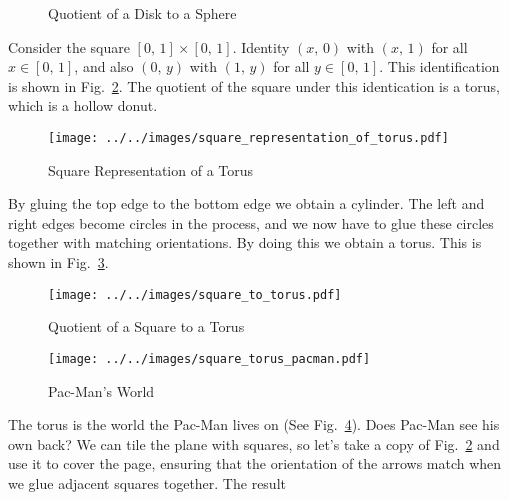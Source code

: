 \documentclass{article}
\theoremstyle{plain}
\theoremstyle{normal}
\begin{document}
        \begin{figure}
            \centering
            \caption{Quotient of a Disk to a Sphere}
            \label{fig:quotient_disk_to_sphere}
        \end{figure}
        Consider the square $[0,\,1]\times[0,\,1]$. Identity
        $(x,\,0)$ with $(x,\,1)$ for all $x\in[0,\,1]$, and also
        $(0,\,y)$ with $(1,\,y)$ for all $y\in[0,\,1]$. This identification
        is shown in Fig.~\ref{fig:square_representation_of_torus}. The quotient
        of the square under this identication is a torus, which is a hollow
        donut.
        \begin{figure}
            \centering
            \texttt{[image: ../../images/square\_representation\_of\_torus.pdf]}
            \caption{Square Representation of a Torus}
            \label{fig:square_representation_of_torus}
        \end{figure}
        \par\hfill\par
        By gluing the top edge to the bottom edge we obtain a cylinder. The
        left and right edges become circles in the process, and we now have to
        glue these circles together with matching orientations. By doing this
        we obtain a torus. This is shown in
        Fig.~\ref{fig:square_to_torus}.
        \begin{figure}
            \centering
            \texttt{[image: ../../images/square\_to\_torus.pdf]}
            \caption{Quotient of a Square to a Torus}
            \label{fig:square_to_torus}
        \end{figure}
        \begin{figure}
            \centering
            \texttt{[image: ../../images/square\_torus\_pacman.pdf]}
            \caption{Pac-Man's World}
            \label{fig:square_torus_pacman}
        \end{figure}
        \par\hfill\par
        The torus is the world the Pac-Man lives on
        (See Fig.~\ref{fig:square_torus_pacman}).
        Does Pac-Man see his own back? We can tile the plane with squares, so
        let's take a copy of Fig.~\ref{fig:square_representation_of_torus}
        and use it to cover the page, ensuring that the orientation of the
        arrows match when we glue adjacent squares together. The result
\end{document}
